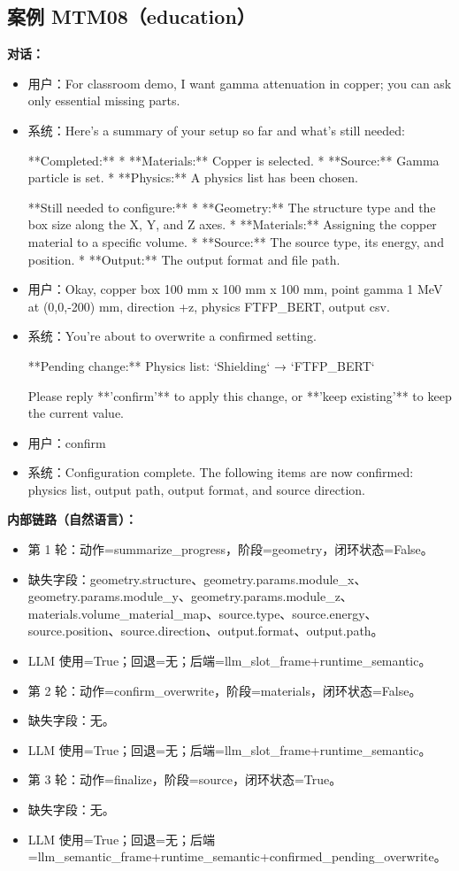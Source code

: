 \documentclass[11pt]{ctexart}
\begin{document}
\subsection{案例 MTM08（education）}
\textbf{对话：}
\begin{itemize}
\item 用户：For classroom demo, I want gamma attenuation in copper; you can ask only essential missing parts.
\item 系统：Here's a summary of your setup so far and what's still needed:

**Completed:**
*   **Materials:** Copper is selected.
*   **Source:** Gamma particle is set.
*   **Physics:** A physics list has been chosen.

**Still needed to configure:**
*   **Geometry:** The structure type and the box size along the X, Y, and Z axes.
*   **Materials:** Assigning the copper material to a specific volume.
*   **Source:** The source type, its energy, and position.
*   **Output:** The output format and file path.
\item 用户：Okay, copper box 100 mm x 100 mm x 100 mm, point gamma 1 MeV at (0,0,-200) mm, direction +z, physics FTFP\_BERT, output csv.
\item 系统：You're about to overwrite a confirmed setting.

**Pending change:**  
Physics list: `Shielding` → `FTFP\_BERT`

Please reply **'confirm'** to apply this change, or **'keep existing'** to keep the current value.
\item 用户：confirm
\item 系统：Configuration complete. The following items are now confirmed: physics list, output path, output format, and source direction.
\end{itemize}
\textbf{内部链路（自然语言）：}
\begin{itemize}
\item 第 1 轮：动作=summarize\_progress，阶段=geometry，闭环状态=False。
\item 缺失字段：geometry.structure、geometry.params.module\_x、geometry.params.module\_y、geometry.params.module\_z、materials.volume\_material\_map、source.type、source.energy、source.position、source.direction、output.format、output.path。
\item LLM 使用=True；回退=无；后端=llm\_slot\_frame+runtime\_semantic。
\item 第 2 轮：动作=confirm\_overwrite，阶段=materials，闭环状态=False。
\item 缺失字段：无。
\item LLM 使用=True；回退=无；后端=llm\_slot\_frame+runtime\_semantic。
\item 第 3 轮：动作=finalize，阶段=source，闭环状态=True。
\item 缺失字段：无。
\item LLM 使用=True；回退=无；后端=llm\_semantic\_frame+runtime\_semantic+confirmed\_pending\_overwrite。
\end{itemize}
\end{document}
